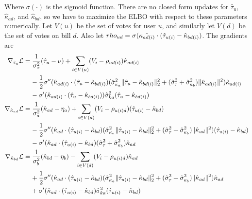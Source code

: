 \documentclass{article}
\begin{document}
Where $\sigma(\cdot)$ is the sigmoid function.
\vskip 10pt
 There are no closed form updates for $\hat{\tau}_u$, $\hat{\kappa}_{ad}$, and $\hat{\kappa}_{bd}$, so we have to maximize the ELBO with respect to these parameters numerically. Let $V(u)$ be the set of votes for user $u$, and similarly let $V(d)$ be the set of votes on bill $d$. Also let $\\rho_{ud} = \sigma(\hat{\kappa_{ad(i)}} \cdot (\hat{\tau}_{u(i)} - \hat{\kappa}_{bd(i)})$. The gradients are
\begin{align*}
\nabla_{\hat{\tau}_u} \mathcal{L} & = \frac{1}{\sigma^2_x}(\hat{\tau}_u - \nu) + \sum_{i \in V(u)}(V_i - \rho_{ud(i)})\hat{\kappa}_{ad(i)}\\
& \;\;\;\; - \frac{1}{2} \sigma''(\hat{\kappa}_{ad(i)} \cdot (\hat{\tau}_{u} - \hat{\kappa}_{bd(i)})(\hat{\sigma}^2_{\kappa_a} \|\hat{\tau}_{u} - \hat{\kappa}_{bd(i)}\|_2^2 + (\hat{\sigma}^2_{\tau} + \hat{\sigma}^2_{\kappa_b})\|\hat{\kappa}_{ad(i)}\|^2)\hat{\kappa}_{ad(i)}\\
& \;\;\;\; - \sigma'(\hat{\kappa}_{ad(i)} \cdot (\hat{\tau}_{u} - \hat{\kappa}_{bd(i)}))\hat{\sigma}^2_{ka}(\hat{\tau}_u - \hat{\kappa}_{bd(i)})\\
\nabla_{\hat{\kappa}_{ad}} \mathcal{L} & = \frac{1}{\sigma^2_a}(\hat{\kappa}_{ad} - \eta_a) + \sum_{i \in V(d)}(V_i - \rho_{u(i)d})(\hat{\tau}_{u(i)} - \hat{\kappa}_{bd})\\
& \;\;\;\; - \frac{1}{2} \sigma''(\hat{\kappa}_{ad} \cdot (\hat{\tau}_{u(i)} - \hat{\kappa}_{bd})(\hat{\sigma}^2_{\kappa_a} \|\hat{\tau}_{u(i)} - \hat{\kappa}_{bd}\|_2^2 + (\hat{\sigma}^2_{\tau} + \hat{\sigma}^2_{\kappa_b})\|\hat{\kappa}_{ad}\|^2)(\hat{\tau}_{u(i)} - \hat{\kappa}_{bd})\\
& \;\;\;\; - \sigma'(\hat{\kappa}_{ad} \cdot (\hat{\tau}_{u(i)} - \hat{\kappa}_{bd})(\hat{\sigma}^2_{\tau} + \hat{\sigma}^2_{\kappa_b})\hat{\kappa}_{ad}\\
\nabla_{\hat{\kappa}_{bd}} \mathcal{L} & = \frac{1}{\sigma^2_b}(\hat{\kappa}_{bd} - \eta_b) - \sum_{i \in V(d)}(V_i - \rho_{u(i)d})\hat{\kappa}_{ad}\\
& \;\;\;\; + \frac{1}{2} \sigma''(\hat{\kappa}_{ad} \cdot (\hat{\tau}_{u(i)} - \hat{\kappa}_{bd})(\hat{\sigma}^2_{\kappa_a} \|\hat{\tau}_{u(i)} - \hat{\kappa}_{bd}\|_2^2 + (\hat{\sigma}^2_{\tau} + \hat{\sigma}^2_{\kappa_b})\|\hat{\kappa}_{ad}\|^2)\hat{\kappa}_{ad}\\
& \;\;\;\; + \sigma'(\hat{\kappa}_{ad} \cdot (\hat{\tau}_{u(i)} - \hat{\kappa}_{bd})\hat{\sigma}^2_{ka}(\hat{\tau}_{u(i)} - \hat{\kappa}_{bd})
\end{align*}
\end{document}
